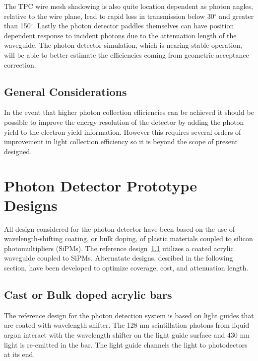 The TPC wire mesh shadowing is also quite location dependent as photon
angles, relative to the wire plane, lead to rapid loss in transmission
below 30$^{\circ}$ and greater than 150$^{\circ}$. Lastly the photon
detector paddles themselves can have position dependent response to
incident photons due to the attenuation length of the waveguide. The
photon detector simulation, which is nearing stable operation, will be
able to better estimate the efficiencies coming from geometric
acceptance correction.


\subsection{General Considerations}
In the event that higher photon collection efficiencies can be
achieved it should be possible to improve the energy resolution of the
detector by adding the photon yield to the electron yield information.
However this requires several orders of improvement in light
collection efficiency so it is beyond the scope of present designed.

\section{Photon Detector Prototype Designs}

All design considered for the photon detector have been based on the
use of wavelength-shifting coating, or bulk doping, of plastic
materials coupled to silicon photomultipliers (SiPMs). The reference
design~\ref{sec_bars} utilizes a coated acrylic waveguide coupled to
SiPMs. Alternatate designs, desribed in the following section, have
been developed to optimize coverage, cost, and attenuation length. 

\subsection{Cast or Bulk doped acrylic bars}
\label{sec_bars}

The reference design for the photon detection system is based on light
guides that are coated with wavelength shifter. The 128 nm
scintillation photons from liquid argon interact with the wavelength
shifter on the light guide surface and 430 nm light is re-emitted in
the bar.  The light guide channels the light to photodectors at its
end.

